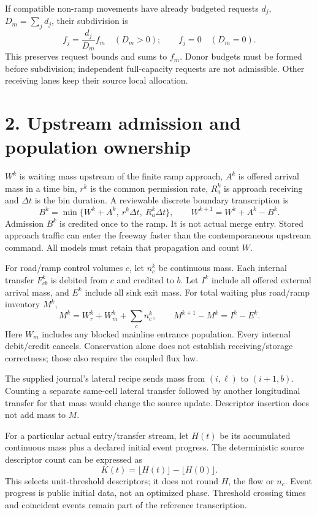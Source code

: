 \documentclass[11pt,a4paper]{article}
\begin{document}
If compatible non-ramp movements have already budgeted requests $d_j$,
$D_m=\sum_jd_j$, their subdivision is
\begin{equation}
f_j=\frac{d_j}{D_m}f_m\quad(D_m>0);\qquad f_j=0\quad(D_m=0).
\end{equation}
This preserves request bounds and sums to $f_m$. Donor budgets must be formed
before subdivision; independent full-capacity requests are not admissible.
Other receiving lanes keep their source local allocation.

\newpage
\section*{2. Upstream admission and population ownership}
$W^k$ is waiting mass upstream of the finite ramp approach, $A^k$ is offered
arrival mass in a time bin, $r^k$ is the common permission rate, $R_a^k$ is
approach receiving and $\Delta t$ is the bin duration. A reviewable discrete
boundary transcription is
\begin{equation}
B^k=\min\{W^k+A^k,\ r^k\Delta t,\ R_a^k\Delta t\},\qquad
W^{k+1}=W^k+A^k-B^k.
\end{equation}
Admission $B^k$ is credited once to the ramp. It is not actual merge entry.
Stored approach traffic can enter the freeway faster than the contemporaneous
upstream command. All models must retain that propagation and count $W$.

For road/ramp control volumes $c$, let $n_c^k$ be continuous mass. Each internal
transfer $F_{cb}^k$ is debited from $c$ and credited to $b$. Let $I^k$ include
all offered external arrival mass, and $E^k$ include all sink exit mass. For
total waiting plus road/ramp inventory $M^k$,
\begin{equation}
M^k=W_r^k+W_m^k+\sum_cn_c^k,\qquad
M^{k+1}-M^k=I^k-E^k.
\end{equation}
Here $W_m$ includes any blocked mainline entrance population. Every internal
debit/credit cancels. Conservation alone does not establish receiving/storage
correctness; those also require the coupled flux law.

The supplied journal's lateral recipe sends mass from $(i,\ell)$ to $(i+1,b)$.
Counting a separate same-cell lateral transfer followed by another longitudinal
transfer for that mass would change the source update. Descriptor insertion
does not add mass to $M$.

For a particular actual entry/transfer stream, let $H(t)$ be its accumulated
continuous mass plus a declared initial event progress. The deterministic
source descriptor count can be expressed as
\begin{equation}
K(t)=\lfloor H(t)\rfloor-\lfloor H(0)\rfloor.
\end{equation}
This selects unit-threshold descriptors; it does not round $H$, the flow or
$n_c$. Event progress is public initial data, not an optimized phase. Threshold
crossing times and coincident events remain part of the reference transcription.
\end{document}
